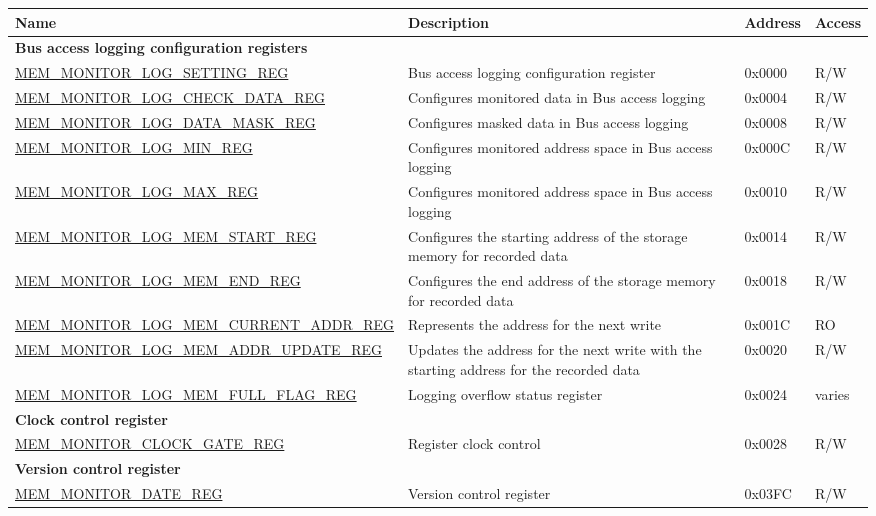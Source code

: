 \begin{longtable}{ | l| m{5cm} | l | l | }
\hline\rowcolor{lightgray}
{\bfseries Name} & {\bfseries Description} &  {\bfseries Address} & {\bfseries Access} \\ \hline
\endhead
\multicolumn{4}{|l|}{\textbf{Bus access logging configuration registers}} \\ \hline
\hyperref[regdesc:MEMMONITORLOGSETTINGREG]{MEM\_MONITOR\_LOG\_SETTING\_REG} & Bus access logging configuration register & 0x0000 & R/W \\ \hline
\hyperref[regdesc:MEMMONITORLOGCHECKDATAREG]{MEM\_MONITOR\_LOG\_CHECK\_DATA\_REG} & Configures monitored data in Bus access logging & 0x0004 & R/W \\ \hline
\hyperref[regdesc:MEMMONITORLOGDATAMASKREG]{MEM\_MONITOR\_LOG\_DATA\_MASK\_REG} & Configures masked data in Bus access logging & 0x0008 & R/W \\ \hline
\hyperref[regdesc:MEMMONITORLOGMINREG]{MEM\_MONITOR\_LOG\_MIN\_REG} & Configures monitored address space in Bus access logging & 0x000C & R/W \\ \hline
\hyperref[regdesc:MEMMONITORLOGMAXREG]{MEM\_MONITOR\_LOG\_MAX\_REG} & Configures monitored address space in Bus access logging & 0x0010 & R/W \\ \hline
\hyperref[regdesc:MEMMONITORLOGMEMSTARTREG]{MEM\_MONITOR\_LOG\_MEM\_START\_REG} & Configures the starting address of the storage memory for recorded data & 0x0014 & R/W \\ \hline
\hyperref[regdesc:MEMMONITORLOGMEMENDREG]{MEM\_MONITOR\_LOG\_MEM\_END\_REG} & Configures the end address of the storage memory for recorded data & 0x0018 & R/W \\ \hline
\hyperref[regdesc:MEMMONITORLOGMEMCURRENTADDRREG]{MEM\_MONITOR\_LOG\_MEM\_CURRENT\_ADDR\_REG} & Represents the address for the next write & 0x001C & RO \\ \hline
\hyperref[regdesc:MEMMONITORLOGMEMADDRUPDATEREG]{MEM\_MONITOR\_LOG\_MEM\_ADDR\_UPDATE\_REG} & Updates the address for the next write with the starting address for the recorded data & 0x0020 & R/W \\ \hline
\hyperref[regdesc:MEMMONITORLOGMEMFULLFLAGREG]{MEM\_MONITOR\_LOG\_MEM\_FULL\_FLAG\_REG} & Logging overflow status register & 0x0024 & varies \\ \hline
\multicolumn{4}{|l|}{\textbf{Clock control register}} \\ \hline
\hyperref[regdesc:MEMMONITORCLOCKGATEREG]{MEM\_MONITOR\_CLOCK\_GATE\_REG} &  Register clock control & 0x0028 & R/W \\ \hline
\multicolumn{4}{|l|}{\textbf{Version control register}} \\ \hline
\hyperref[regdesc:MEMMONITORDATEREG]{MEM\_MONITOR\_DATE\_REG} & Version control register & 0x03FC & R/W \\ \hline
\end{longtable}

